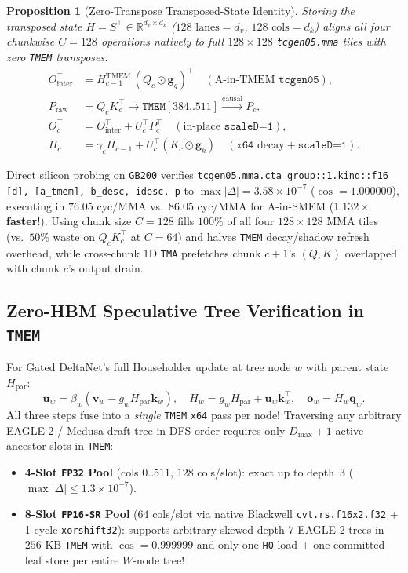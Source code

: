 \documentclass[conference,10pt]{IEEEtran}
\newtheorem{proposition}{Proposition}
\begin{document}
\begin{proposition}[Zero-Transpose Transposed-State Identity]
Storing the transposed state $H = S^\top \in \mathbb{R}^{d_v \times d_k}$ ($128\text{ lanes} = d_v$, $128\text{ cols} = d_k$) aligns \emph{all four} chunkwise $C{=}128$ operations natively to full $128{\times}128$ \texttt{tcgen05.mma} tiles with zero \texttt{TMEM} transposes:
\begin{align}
O_{\text{inter}}^\top &= H_{c-1}^{\text{TMEM}} \, (Q_c \odot \mathbf{g}_q)^\top \quad (\text{A-in-TMEM } \texttt{tcgen05}), \\
P_{\text{raw}} &= Q_c K_c^\top \to \texttt{TMEM}[384..511] \xrightarrow{\text{causal}} P_c, \\
O_c^\top &= O_{\text{inter}}^\top + U_c^\top P_c^\top \quad (\text{in-place } \texttt{scaleD=1}), \\
H_c &= \gamma_c H_{c-1} + U_c^\top (K_c \odot \mathbf{g}_k) \quad (\texttt{x64}\text{ decay} + \texttt{scaleD=1}).
\end{align}
\end{proposition}
Direct silicon probing on \texttt{GB200} verifies \texttt{tcgen05.mma.cta\_group::1.kind::f16 [d], [a\_tmem], b\_desc, idesc, p} to $\max|\Delta| = 3.58{\times}10^{-7}$ ($\cos{=}1.000000$), executing in \textbf{$76.05\text{ cyc/MMA}$} vs.\ $86.05\text{ cyc/MMA}$ for A-in-SMEM (\textbf{$1.132\times$ faster}!). Using chunk size $C{=}128$ fills $100\%$ of all four $128{\times}128$ MMA tiles (vs.\ $50\%$ waste on $Q_c K_c^\top$ at $C{=}64$) and halves \texttt{TMEM} decay/shadow refresh overhead, while cross-chunk 1D \texttt{TMA} prefetches chunk $c{+}1$'s $(Q, K)$ overlapped with chunk $c$'s output drain.

\subsection{Zero-HBM Speculative Tree Verification in \texttt{TMEM}}
For Gated DeltaNet's full Householder update at tree node $w$ with parent state $H_{\text{par}}$:
\begin{equation}
\mathbf{u}_w = \beta_w (\mathbf{v}_w - g_w H_{\text{par}} \mathbf{k}_w), \quad H_w = g_w H_{\text{par}} + \mathbf{u}_w \mathbf{k}_w^\top, \quad \mathbf{o}_w = H_w \mathbf{q}_w.
\end{equation}
All three steps fuse into a \emph{single} \texttt{TMEM} \texttt{x64} pass per node! Traversing any arbitrary EAGLE-2 / Medusa draft tree in DFS order requires only $D_{\max}{+}1$ active ancestor slots in \texttt{TMEM}:
\begin{itemize}
    \item \textbf{4-Slot \texttt{FP32} Pool} (cols $0..511$, $128$ cols/slot): exact up to depth~$3$ ($\max|\Delta| \le 1.3{\times}10^{-7}$).
    \item \textbf{8-Slot \texttt{FP16-SR} Pool} ($64$ cols/slot via native Blackwell \texttt{cvt.rs.f16x2.f32} + 1-cycle \texttt{xorshift32}): supports arbitrary skewed depth-$7$ EAGLE-2 trees in $256\text{ KB}$ \texttt{TMEM} with $\cos{=}0.999999$ and only one \texttt{H0} load + one committed leaf store per entire $W$-node tree!
\end{itemize}
\end{document}
